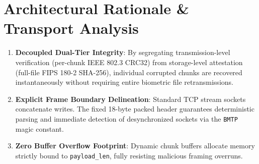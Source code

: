 \documentclass[11pt,a4paper]{article}
\begin{document}
\section{Architectural Rationale \& Transport Analysis}

\begin{enumerate}
    \item \textbf{Decoupled Dual-Tier Integrity}: By segregating transmission-level verification (per-chunk IEEE 802.3 CRC32) from storage-level attestation (full-file FIPS 180-2 SHA-256), individual corrupted chunks are recovered instantaneously without requiring entire biometric file retransmissions.
    \item \textbf{Explicit Frame Boundary Delineation}: Standard TCP stream sockets concatenate writes. The fixed 18-byte packed header guarantees deterministic parsing and immediate detection of desynchronized sockets via the \texttt{BMTP} magic constant.
    \item \textbf{Zero Buffer Overflow Footprint}: Dynamic chunk buffers allocate memory strictly bound to \texttt{payload\_len}, fully resisting malicious framing overruns.
\end{enumerate}
\end{document}
